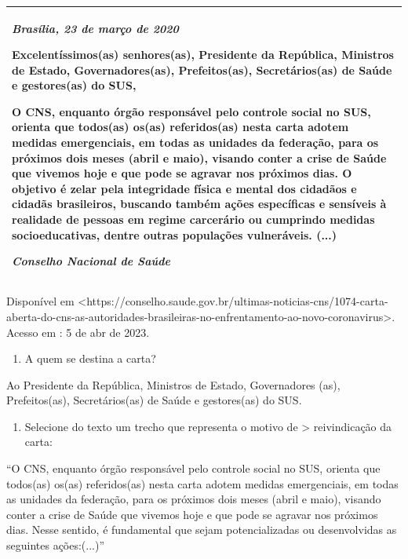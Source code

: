 \begin{longtable}[]{@{}
  >{\raggedright\arraybackslash}p{}@{}}
\toprule
\endhead
\emph{Brasília, 23 de março de 2020}

Excelentíssimos(as) senhores(as), Presidente da República, Ministros de
Estado, Governadores(as), Prefeitos(as), Secretários(as) de Saúde e
gestores(as) do SUS,

O CNS, enquanto órgão responsável pelo controle social no SUS, orienta
que todos(as) os(as) referidos(as) nesta carta adotem medidas
emergenciais, em todas as unidades da federação, para os próximos dois
meses (abril e maio), visando conter a crise de Saúde que vivemos hoje e
que pode se agravar nos próximos dias. O objetivo é zelar pela
integridade física e mental dos cidadãos e cidadãs brasileiros, buscando
também ações específicas e sensíveis à realidade de pessoas em regime
carcerário ou cumprindo medidas socioeducativas, dentre outras
populações vulneráveis. (...)

\emph{Conselho Nacional de Saúde} \\
\bottomrule
\end{longtable}

Disponível em
\textless https://conselho.saude.gov.br/ultimas-noticias-cns/1074-carta-aberta-do-cns-as-autoridades-brasileiras-no-enfrentamento-ao-novo-coronavirus\textgreater.
Acesso em : 5 de abr de 2023.

\begin{enumerate}
\def\labelenumi{\arabic{enumi})}
\setcounter{enumi}{7}
\tightlist
\item
  A quem se destina a carta?
\end{enumerate}

Ao Presidente da República, Ministros de Estado, Governadores (as),
Prefeitos(as), Secretários(as) de Saúde e gestores(as) do SUS.

\begin{enumerate}
\def\labelenumi{\arabic{enumi})}
\setcounter{enumi}{8}
\tightlist
\item
  Selecione do texto um trecho que representa o motivo de \textgreater{}
  reivindicação da carta:
\end{enumerate}

``O CNS, enquanto órgão responsável pelo controle social no SUS, orienta
que todos(as) os(as) referidos(as) nesta carta adotem medidas
emergenciais, em todas as unidades da federação, para os próximos dois
meses (abril e maio), visando conter a crise de Saúde que vivemos hoje e
que pode se agravar nos próximos dias. Nesse sentido, é fundamental que
sejam potencializadas ou desenvolvidas as seguintes ações:(...)''

